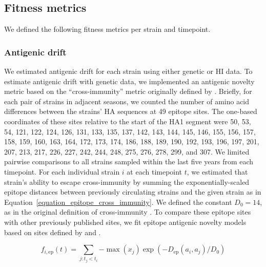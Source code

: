 \subsection*{Fitness metrics}

We defined the following fitness metrics per strain and timepoint.

\subsubsection*{Antigenic drift}

We estimated antigenic drift for each strain using either genetic or HI data.
To estimate antigenic drift with genetic data, we implemented an antigenic novelty metric based on the ``cross-immunity'' metric originally defined by \cite{Luksza:2014hj}.
Briefly, for each pair of strains in adjacent seasons, we counted the number of amino acid differences between the strains' HA sequences at 49 epitope sites.
The one-based coordinates of these sites relative to the start of the HA1 segment were 50, 53, 54, 121, 122, 124, 126, 131, 133, 135, 137, 142, 143, 144, 145, 146, 155, 156, 157, 158, 159, 160, 163, 164, 172, 173, 174, 186, 188, 189, 190, 192, 193, 196, 197, 201, 207, 213, 217, 226, 227, 242, 244, 248, 275, 276, 278, 299, and 307.
We limited pairwise comparisons to all strains sampled within the last five years from each timepoint.
For each individual strain $i$ at each timepoint $t$, we estimated that strain's ability to escape cross-immunity by summing the exponentially-scaled epitope distances between previously circulating strains and the given strain as in Equation~\ref{equation_epitope_cross_immunity}.
We defined the constant $D_{0} = 14$, as in the original definition of cross-immunity \citep{Luksza:2014hj}.
To compare these epitope sites with other previously published sites, we fit epitope antigenic novelty models based on sites defined by \cite{Wolf:2006da} and \cite{Koel:2013jz}.

\begin{equation}
    f_{i,\mathrm{ep}}(t) = \sum_{j: t_{j} < t_{i}}{-\max(x_{j})\exp{(-D_{\mathrm{ep}}(a_{i}, a_{j}) / D_{0})}}
    \label{equation_epitope_cross_immunity}
\end{equation}


